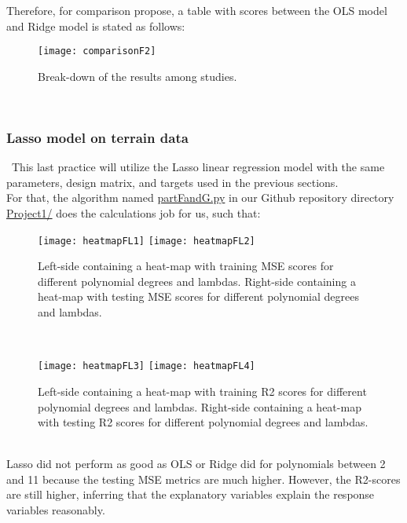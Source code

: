 Therefore, for comparison propose, a table with scores between the OLS model and Ridge model is stated as follows: \\

\begin{figure}[H]
\label{fig:comparisonF2}
\centering
\texttt{[image: comparisonF2]}
\caption{Break-down of the results among studies.}
\end{figure}\\

\subsubsection{Lasso model on terrain data}
\label{chap:Lasso model on terrain data}

\quad \, This last practice will utilize the Lasso linear regression model with the same parameters, design matrix, and targets used in the previous sections. \\

For that, the algorithm named \href{https://github.com/fabiorodp/UiO-FYS-STK4155/blob/master/Project1/partFandG.py}{partFandG.py} in our Github repository directory \href{https://github.com/fabiorodp/UiO-FYS-STK4155/blob/master/Project1/}{Project1/} does the calculations job for us, such that: \\

\begin{figure}[H]
\label{fig:heatmapFL1and2}
\centering
\texttt{[image: heatmapFL1]}
\texttt{[image: heatmapFL2]}
\caption{Left-side containing a heat-map with training MSE scores for different polynomial degrees and lambdas. Right-side containing a heat-map with testing MSE scores for different polynomial degrees and lambdas.}
\end{figure}\\

\begin{figure}[H]
\label{fig:heatmapFL3and4}
\centering
\texttt{[image: heatmapFL3]}
\texttt{[image: heatmapFL4]}
\caption{Left-side containing a heat-map with training R2 scores for different polynomial degrees and lambdas. Right-side containing a heat-map with testing R2 scores for different polynomial degrees and lambdas.}
\end{figure}\\

Lasso did not perform as good as OLS or Ridge did for polynomials between 2 and 11 because the testing MSE metrics are much higher. However, the R2-scores are still higher, inferring that the explanatory variables explain the response variables reasonably.\\

